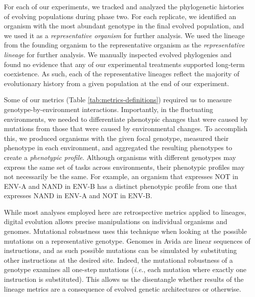 For each of our experiments, we tracked and analyzed the phylogenetic histories of evolving populations during phase two. 
For each replicate, we identified an organism with the most abundant genotype in the final evolved population, and we used it as a \textit{representative organism} for further analysis.
We used the lineage from the founding organism to the representative organism as the \textit{representative lineage} for further analysis.
We manually inspected evolved phylogenies and found no evidence that any of our experimental treatments supported long-term coexistence. 
As such, each of the representative lineages reflect the majority of evolutionary history from a given population at the end of our experiment.

Some of our metrics (Table \ref{tab:metrics-definitions}) required us to measure genotype-by-environment interactions.
Importantly, in the fluctuating environments, we needed to differentiate phenotypic changes that were caused by mutations from those that were caused by environmental changes.
To accomplish this, we produced organisms with the given focal genotype, measured their phenotype in each environment, and aggregated the resulting phenotypes to create a \textit{phenotypic profile}. 
Although organisms with different genotypes may express the same set of tasks across environments, their phenotypic profiles may not necessarily be the same.
For example, an organism that expresses NOT in ENV-A and NAND in ENV-B has a distinct phenotypic profile from one that expresses NAND in ENV-A and NOT in ENV-B.

While most analyses employed here are retrospective metrics applied to lineages, digital evolution allows precise manipulations on individual organisms and genomes. 
Mutational robustness uses this technique when looking at the possible mutations on a representative genotype. 
Genomes in Avida are linear sequences of instructions, and as such possible mutations can be simulated by substituting other instructions at the desired site. 
Indeed, the mutational robustness of a genotype examines all one-step mutations (\textit{i.e.}, each mutation where exactly one instruction is substituted). 
This allows us the disentangle whether results of the lineage metrics are a consequence of evolved genetic architectures or otherwise. 


